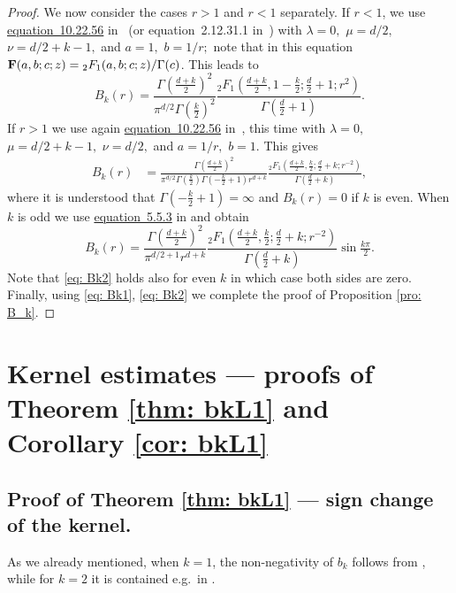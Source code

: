 \documentclass[a4paper,12pt,reqno]{amsart}
\numberwithin{equation}{section}
\theoremstyle{definition}
\begin{document}
\begin{proof}
We  now consider  the cases $r>1$ and $r<1$ separately. If $r<1$, we use \href{https://dlmf.nist.gov/10.22.E56}{equation~10.22.56} in~\cite{dlmf} (or equation~2.12.31.1 in~\cite{prudnikov}) with  $\lambda=0,$ $\mu=d/2,$ $\nu=d/2+k-1,$ and $a=1,$ $b=1/r;$ note that in this equation ${\bf F}(a,b;c;z)={_2}F_1(a,b;c;z)/\Gamma(c)$. This leads to
\begin{equation}
\label{eq: Bk1}
  B_k(r)=\frac{\Gamma(\frac{d + k}{2})^2}{\pi^{d/2}\Gamma(\frac{k}{2})^2}\frac{{_2}F_1(\tfrac{d + k}{2}, 1-\tfrac{k}{2}; \tfrac{d}{2} + 1; r^{2})}{\Gamma(\frac{d}{2}+1)}.
\end{equation}
If $r>1$ we use again \href{https://dlmf.nist.gov/10.22.E56}{equation~10.22.56} in~\cite{dlmf}, this time with $\lambda=0,$ $\mu=d/2+k-1,$ $\nu=d/2,$ and $a=1/r,$ $b=1.$ This gives
\begin{align*}
  B_k(r)&=\frac{\Gamma(\frac{d + k}{2})^2}{\pi^{d/2}\Gamma(\frac{k}{2})\Gamma(-\frac{k}{2}+1)r^{d+k}}\frac{{_2}F_1(\tfrac{d + k}{2}, \tfrac{k}{2}; \tfrac{d}{2} + k; r^{-2})}{\Gamma(\frac{d}{2}+k)},
\end{align*}
where it is understood that $\Gamma(-\frac{k}{2} + 1) = \infty$ and $B_k(r) = 0$ if $k$ is even. When $k$ is odd we use \href{https://dlmf.nist.gov/5.5.E3}{equation~5.5.3} in \cite{dlmf} and obtain
\begin{equation}
\label{eq: Bk2}
  B_k(r)=\frac{\Gamma(\frac{d + k}{2})^2}{\pi^{d/2+1}r^{d+k}}\frac{{_2}F_1(\tfrac{d + k}{2}, \tfrac{k}{2}; \tfrac{d}{2} + k; r^{-2})}{\Gamma(\frac{d}{2}+k)}\sin\tfrac{k\pi}{2}.
\end{equation}
Note that \eqref{eq: Bk2} holds also for even $k$ in which case both sides are zero. Finally, using \eqref{eq: Bk1}, \eqref{eq: Bk2} we complete the proof of Proposition \ref{pro: B_k}.



\end{proof}


\section{Kernel estimates --- proofs of Theorem \ref{thm: bkL1} and Corollary \ref{cor: bkL1}}

\label{sec: kere}

\subsection{Proof of Theorem \ref{thm: bkL1} --- sign change of the kernel.}
As we already mentioned, when $k=1$, the non-negativity of $b_k$ follows from \cite{LiuMeZhu}, while for $k=2$ it is contained e.g.\ in \cite[p.\ 427]{verdera conf}. 
\end{document}
